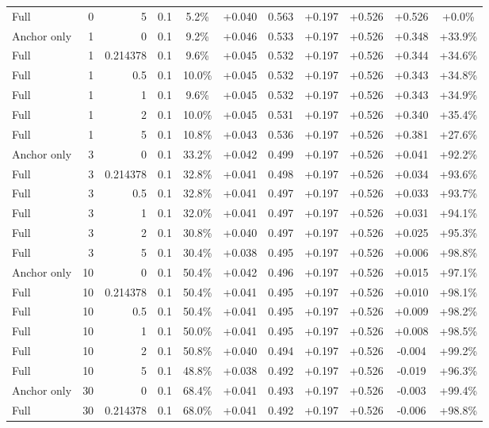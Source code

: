 \begin{table}[htbp]
\begin{tabular}{lrrrccccccc}
Full & 0 & 5 & 0.1 & 5.2\% & +0.040 & 0.563 & +0.197 & +0.526 & +0.526 & +0.0\% \\
Anchor only & 1 & 0 & 0.1 & 9.2\% & +0.046 & 0.533 & +0.197 & +0.526 & +0.348 & +33.9\% \\
Full & 1 & 0.214378 & 0.1 & 9.6\% & +0.045 & 0.532 & +0.197 & +0.526 & +0.344 & +34.6\% \\
Full & 1 & 0.5 & 0.1 & 10.0\% & +0.045 & 0.532 & +0.197 & +0.526 & +0.343 & +34.8\% \\
Full & 1 & 1 & 0.1 & 9.6\% & +0.045 & 0.532 & +0.197 & +0.526 & +0.343 & +34.9\% \\
Full & 1 & 2 & 0.1 & 10.0\% & +0.045 & 0.531 & +0.197 & +0.526 & +0.340 & +35.4\% \\
Full & 1 & 5 & 0.1 & 10.8\% & +0.043 & 0.536 & +0.197 & +0.526 & +0.381 & +27.6\% \\
Anchor only & 3 & 0 & 0.1 & 33.2\% & +0.042 & 0.499 & +0.197 & +0.526 & +0.041 & +92.2\% \\
Full & 3 & 0.214378 & 0.1 & 32.8\% & +0.041 & 0.498 & +0.197 & +0.526 & +0.034 & +93.6\% \\
Full & 3 & 0.5 & 0.1 & 32.8\% & +0.041 & 0.497 & +0.197 & +0.526 & +0.033 & +93.7\% \\
Full & 3 & 1 & 0.1 & 32.0\% & +0.041 & 0.497 & +0.197 & +0.526 & +0.031 & +94.1\% \\
Full & 3 & 2 & 0.1 & 30.8\% & +0.040 & 0.497 & +0.197 & +0.526 & +0.025 & +95.3\% \\
Full & 3 & 5 & 0.1 & 30.4\% & +0.038 & 0.495 & +0.197 & +0.526 & +0.006 & +98.8\% \\
Anchor only & 10 & 0 & 0.1 & 50.4\% & +0.042 & 0.496 & +0.197 & +0.526 & +0.015 & +97.1\% \\
Full & 10 & 0.214378 & 0.1 & 50.4\% & +0.041 & 0.495 & +0.197 & +0.526 & +0.010 & +98.1\% \\
Full & 10 & 0.5 & 0.1 & 50.4\% & +0.041 & 0.495 & +0.197 & +0.526 & +0.009 & +98.2\% \\
Full & 10 & 1 & 0.1 & 50.0\% & +0.041 & 0.495 & +0.197 & +0.526 & +0.008 & +98.5\% \\
Full & 10 & 2 & 0.1 & 50.8\% & +0.040 & 0.494 & +0.197 & +0.526 & -0.004 & +99.2\% \\
Full & 10 & 5 & 0.1 & 48.8\% & +0.038 & 0.492 & +0.197 & +0.526 & -0.019 & +96.3\% \\
Anchor only & 30 & 0 & 0.1 & 68.4\% & +0.041 & 0.493 & +0.197 & +0.526 & -0.003 & +99.4\% \\
Full & 30 & 0.214378 & 0.1 & 68.0\% & +0.041 & 0.492 & +0.197 & +0.526 & -0.006 & +98.8\% \\

\end{tabular}
\end{table}
